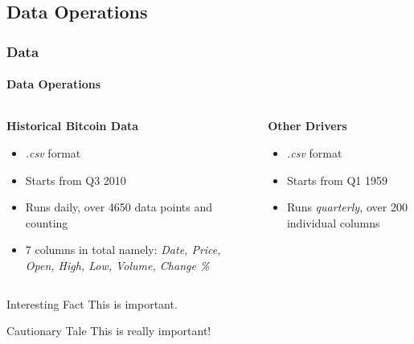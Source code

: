 \documentclass{beamer}
\begin{document}
	\subsection{Data Operations}	
	\begin{frame}
	\frametitle{Data}
		\framesubtitle{Data Operations}
		\begin{columns}
				\begin{column}{0.5\textwidth}
					\textbf{Historical Bitcoin Data}
					\begin{itemize}
						\item \emph{.csv} format
						\item Starts from Q3 2010
						\item Runs daily, over 4650 data points and counting
						\item 7 columns in total namely: \emph{Date, Price, Open, High, Low, Volume, Change \%}
					\end{itemize}
				\end{column}
				\begin{column}{0.5\textwidth}
					\textbf{Other Drivers}
				\begin{itemize}
					\item \emph{.csv} format
					\item Starts from Q1 1959
					\item Runs \emph{quarterly,} over 200 individual columns
				\end{itemize}
				\end{column}
		\end{columns}
	\end{frame}
	\begin{frame}
		\begin{block}{Interesting Fact}
			This is important.
		\end{block}
		\begin{alertblock}{Cautionary Tale}
			This is really important!
		\end{alertblock}
	\end{frame}
	
\end{document}
